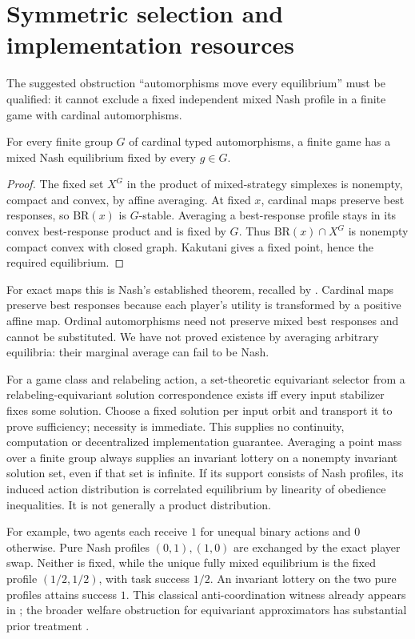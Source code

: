 \section{Symmetric selection and implementation resources}\label{sec:03-selection-1}
The suggested obstruction ``automorphisms move every equilibrium'' must be
qualified: it cannot exclude a fixed independent mixed Nash profile in a
finite game with cardinal automorphisms.

\begin{proposition}\label{result:03-selection-1}
For every finite group $G$ of cardinal typed automorphisms, a finite game
has a mixed Nash equilibrium fixed by every $g\in G$.
\end{proposition}
\begin{proof}
The fixed set $X^G$ in the product of mixed-strategy simplexes is nonempty,
compact and convex, by affine averaging. At fixed $x$, cardinal maps preserve
best responses, so $\mathrm{BR}(x)$ is $G$-stable. Averaging a best-response
profile stays in its convex best-response product and is fixed by $G$.
Thus $\mathrm{BR}(x)\cap X^G$ is nonempty compact convex with closed graph.
Kakutani gives a fixed point, hence the required equilibrium.
\end{proof}
For exact maps this is Nash's established theorem, recalled by
\citet[Theorem 7, long version]{tewolde2025}. Cardinal maps preserve best responses because each player's utility is
transformed by a positive affine map. Ordinal automorphisms need not preserve mixed
best responses and cannot be substituted. We have not proved existence by
averaging arbitrary equilibria: their marginal average can fail to be Nash.

For a game class and relabeling action, a set-theoretic equivariant selector
from a relabeling-equivariant solution correspondence exists iff every input stabilizer fixes some
solution. Choose a fixed solution per input orbit and transport it to prove
sufficiency; necessity is immediate. This supplies no continuity, computation
or decentralized implementation guarantee. Averaging a point mass over a finite
group always supplies an invariant lottery on a nonempty invariant solution
set, even if that set is infinite. If its support consists of Nash profiles,
its induced action distribution is correlated equilibrium by linearity of
obedience inequalities. It is not generally a product distribution.

For example, two agents each receive $1$ for unequal binary actions and $0$
otherwise. Pure Nash profiles $(0,1),(1,0)$ are exchanged by the exact player
swap. Neither is fixed, while the unique fully mixed equilibrium is the fixed
profile $(1/2,1/2)$, with task success $1/2$. An invariant lottery on the two
pure profiles attains success $1$. This classical anti-coordination witness
already appears in \citet{cheng2004}; the broader welfare obstruction for
equivariant approximators has substantial prior treatment \citep{duan2023}.

